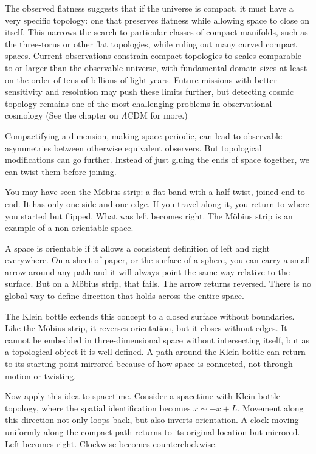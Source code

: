 The observed flatness suggests that if the universe is compact, it must have a very specific topology: one that preserves flatness while allowing space to close on itself. This narrows the search to particular classes of compact manifolds, such as the three-torus or other flat topologies, while ruling out many curved compact spaces. Current observations constrain compact topologies to scales comparable to or larger than the observable universe, with fundamental domain sizes at least on the order of tens of billions of light-years. Future missions with better sensitivity and resolution may push these limits further, but detecting cosmic topology remains one of the most challenging problems in observational cosmology (See the chapter on $\Lambda$CDM for more.)

Compactifying a dimension, making space periodic, can lead to observable asymmetries between otherwise equivalent observers. But topological modifications can go further. Instead of just gluing the ends of space together, we can twist them before joining.

You may have seen the Möbius strip: a flat band with a half-twist, joined end to end. It has only one side and one edge. If you travel along it, you return to where you started but flipped. What was left becomes right. The Möbius strip is an example of a non-orientable space.

A space is orientable if it allows a consistent definition of left and right everywhere. On a sheet of paper, or the surface of a sphere, you can carry a small arrow around any path and it will always point the same way relative to the surface. But on a Möbius strip, that fails. The arrow returns reversed. There is no global way to define direction that holds across the entire space.

The Klein bottle extends this concept to a closed surface without boundaries. Like the Möbius strip, it reverses orientation, but it closes without edges. It cannot be embedded in three-dimensional space without intersecting itself, but as a topological object it is well-defined. A path around the Klein bottle can return to its starting point mirrored because of how space is connected, not through motion or twisting.

Now apply this idea to spacetime. Consider a spacetime with Klein bottle topology, where the spatial identification becomes $x \sim -x + L$. Movement along this direction not only loops back, but also inverts orientation. A clock moving uniformly along the compact path returns to its original location but mirrored. Left becomes right. Clockwise becomes counterclockwise.

